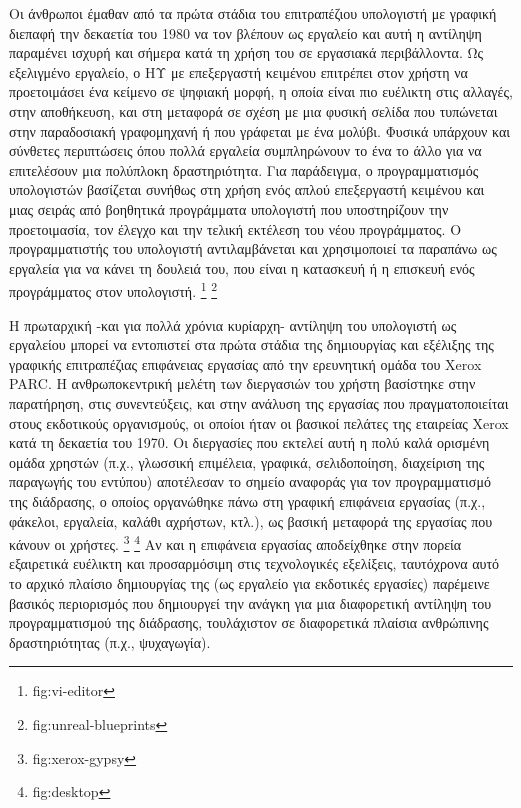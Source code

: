 \documentclass[
]{article}
\begin{document}
Οι άνθρωποι έμαθαν από τα πρώτα στάδια του επιτραπέζιου υπολογιστή με
γραφική διεπαφή την δεκαετία του 1980 να τον βλέπουν ως εργαλείο και
αυτή η αντίληψη παραμένει ισχυρή και σήμερα κατά τη χρήση του σε
εργασιακά περιβάλλοντα. Ως εξελιγμένο εργαλείο, ο ΗΥ με επεξεργαστή
κειμένου επιτρέπει στον χρήστη να προετοιμάσει ένα κείμενο σε ψηφιακή
μορφή, η οποία είναι πιο ευέλικτη στις αλλαγές, στην αποθήκευση, και στη
μεταφορά σε σχέση με μια φυσική σελίδα που τυπώνεται στην παραδοσιακή
γραφομηχανή ή που γράφεται με ένα μολύβι. Φυσικά υπάρχουν και σύνθετες
περιπτώσεις όπου πολλά εργαλεία συμπληρώνουν το ένα το άλλο για να
επιτελέσουν μια πολύπλοκη δραστηριότητα. Για παράδειγμα, ο
προγραμματισμός υπολογιστών βασίζεται συνήθως στη χρήση ενός απλού
επεξεργαστή κειμένου και μιας σειράς από βοηθητικά προγράμματα
υπολογιστή που υποστηρίζουν την προετοιμασία, τον έλεγχο και την τελική
εκτέλεση του νέου προγράμματος. Ο προγραμματιστής του υπολογιστή
αντιλαμβάνεται και χρησιμοποιεί τα παραπάνω ως εργαλεία για να κάνει τη
δουλειά του, που είναι η κατασκευή ή η επισκευή ενός προγράμματος στον
υπολογιστή. \footnote{fig:vi-editor} \footnote{fig:unreal-blueprints}

Η πρωταρχική -και για πολλά χρόνια κυρίαρχη- αντίληψη του υπολογιστή ως
εργαλείου μπορεί να εντοπιστεί στα πρώτα στάδια της δημιουργίας και
εξέλιξης της γραφικής επιτραπέζιας επιφάνειας εργασίας από την
ερευνητική ομάδα του Xerox PARC. Η ανθρωποκεντρική μελέτη των διεργασιών
του χρήστη βασίστηκε στην παρατήρηση, στις συνεντεύξεις, και στην
ανάλυση της εργασίας που πραγματοποιείται στους εκδοτικούς οργανισμούς,
οι οποίοι ήταν οι βασικοί πελάτες της εταιρείας Xerox κατά τη δεκαετία
του 1970. Οι διεργασίες που εκτελεί αυτή η πολύ καλά ορισμένη ομάδα
χρηστών (π.χ., γλωσσική επιμέλεια, γραφικά, σελιδοποίηση, διαχείριση της
παραγωγής του εντύπου) αποτέλεσαν το σημείο αναφοράς για τον
προγραμματισμό της διάδρασης, ο οποίος οργανώθηκε πάνω στη γραφική
επιφάνεια εργασίας (π.χ., φάκελοι, εργαλεία, καλάθι αχρήστων, κτλ.), ως
βασική μεταφορά της εργασίας που κάνουν οι χρήστες. \footnote{fig:xerox-gypsy}
\footnote{fig:desktop} Αν και η επιφάνεια εργασίας αποδείχθηκε στην
πορεία εξαιρετικά ευέλικτη και προσαρμόσιμη στις τεχνολογικές εξελίξεις,
ταυτόχρονα αυτό το αρχικό πλαίσιο δημιουργίας της (ως εργαλείο για
εκδοτικές εργασίες) παρέμεινε βασικός περιορισμός που δημιουργεί την
ανάγκη για μια διαφορετική αντίληψη του προγραμματισμού της διάδρασης,
τουλάχιστον σε διαφορετικά πλαίσια ανθρώπινης δραστηριότητας (π.χ.,
ψυχαγωγία).
\end{document}

